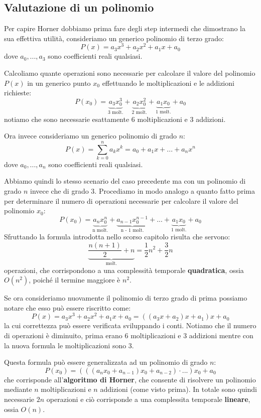 \documentclass[../main.tex]{subfiles}
\begin{document}
\subsection{Valutazione di un polinomio}
Per capire Horner dobbiamo prima fare degli step intermedi che dimostrano la sua effettiva utilità, consideriamo un generico polinomio di terzo grado:
$$
    P(x) = a_3x^3 + a_2x^2 + a_1x + a_0
$$
dove $a_0, ..., a_3$ sono coefficienti reali qualsiasi.

Calcoliamo quante operazioni sono necessarie per calcolare il valore del polinomio $P(x)$ in un generico punto $x_0$ effettuando le moltiplicazioni e le addizioni richieste:
$$
    P(x_0) = \underbrace{a_3x_0^3}_{\text{3 molt.}} + \underbrace{a_2x_0^2}_{\text{2 molt.}} + \underbrace{a_1x_0}_{\text{1 molt.}} + a_0
$$
notiamo che sono necessarie esattamente 6 moltiplicazioni e 3 addizioni.

Ora invece consideriamo un generico polinomio di grado $n$:
$$
    P(x) = \sum_{k=0}^{n} a_kx^k = a_0 + a_1x + ... + a_nx^n
$$
dove $a_0, ..., a_n$ sono coefficienti reali qualsiasi.

Abbiamo quindi lo stesso scenario del caso precedente ma con un polinomio di grado $n$ invece che di grado $3$. Procediamo in modo analogo a quanto fatto prima per determinare il numero di operazioni necessarie per calcolare il valore del polinomio $x_0$:
$$
    P(x_0) = \underbrace{a_nx_0^n}_{\text{n molt.}} + \underbrace{a_{n-1}x_0^{n-1}}_{\text{n - 1 molt.}} + ... + \underbrace{a_1x_0}_{\text{1 molt.}} + a_0
$$
Sfruttando la formula introdotta nello scorso capitolo risulta che servono:
$$
    \underbrace{\frac{n(n+1)}{2} + n}_{\text{molt.}} = \frac{1}{2}n^2 + \frac{3}{2}n
$$
operazioni, che corrispondono a una complessità temporale \textbf{quadratica}, ossia $O(n^2)$, poiché il termine maggiore è $n^2$.

Se ora consideriamo nuovamente il polinomio di terzo grado di prima possiamo notare che esso può essere riscritto come:
$$
    P(x) = a_3x^3 + a_2x^2 + a_1x + a_0 = ((a_3x + a_2)x + a_1)x + a_0
$$
la cui correttezza può essere verificata sviluppando i conti. Notiamo che il numero di operazioni è diminuito, prima erano 6 moltiplicazioni e 3 addizioni mentre con la nuova formula le moltiplicazioni sono 3.

Questa formula può essere generalizzata ad un polinomio di grado $n$:
$$
    P(x_0) = (((a_nx_0 + a_{n-1})x_0 + a_{n-2}) \cdot ...)x_0 + a_0
$$
che corrisponde all'\textbf{algoritmo di Horner}, che consente di risolvere un polinomio mediante $n$ moltiplicazioni e $n$ addizioni (come visto prima). In totale sono quindi necessarie $2n$ operazioni e ciò corrisponde a una complessita temporale \textbf{lineare}, ossia $O(n)$.
\end{document}
